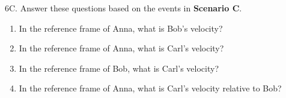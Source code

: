 6C. Answer these questions based on the events in \textbf{Scenario C}.
\begin{enumerate}[SkillBuilderParts]
\item In the reference frame of Anna, what is Bob's velocity?
\answerspace{0.6in}

\item In the reference frame of Anna, what is Carl's velocity?
\answerspace{0.6in}

\item In the reference frame of Bob, what is Carl's velocity?
\answerspace{0.6in}

\item In the reference frame of Anna, what is Carl's velocity relative to Bob?
\answerspace{0.6in}
\end{enumerate}


\pagebreak
\answerspace{0.6in}